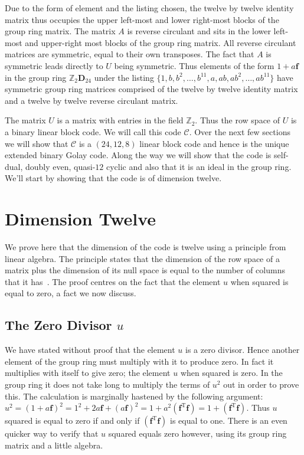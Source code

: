 Due to the form of element and the listing chosen, the twelve by twelve identity matrix thus occupies the upper left-most and lower right-most blocks of the group ring matrix.
The matrix $A$ is reverse circulant and sits in the lower left-most and upper-right most blocks of the group ring matrix.
All reverse circulant matrices are symmetric, equal to their own transposes.
The fact that $A$ is symmetric leads directly to $U$ being symmetric.
Thus elements of the form $1+a\mathbf{f}$ in the group ring $\mathbb{Z}_2 \mathbf{D}_{24}$ under the listing $\{1,b,b^2,\ldots,b^{11},a,ab,ab^2,\ldots,ab^{11}\}$ have symmetric group ring matrices comprised of the twelve by twelve identity matrix and a twelve by twelve reverse circulant matrix.

The matrix $U$ is a matrix with entries in the field $\mathbb{Z}_2$.
Thus the row space of $U$ is a binary linear block code.
We will call this code $\mathcal{C}$.
Over the next few sections we will show that $\mathcal{C}$ is a $(24,12,8)$ linear block code and hence is the unique extended binary Golay code.
Along the way we will show that the code is self-dual, doubly even, quasi-$12$ cyclic and also that it is an ideal in the group ring.
We'll start by showing that the code is of dimension twelve.

\section{Dimension Twelve}
We prove here that the dimension of the code is twelve using a principle from linear algebra.
The principle states that the dimension of the row space of a matrix plus the dimension of its null space is equal to the number of columns that it has~\cite[p.~245]{mac99}.
The proof centres on the fact that the element $u$ when squared is equal to zero, a fact we now discuss.

\subsection{The Zero Divisor $u$}
\label{sect:golayzdu}
We have stated without proof that the element $u$ is a zero divisor.
Hence another element of the group ring must multiply with it to produce zero.
In fact it multiplies with itself to give zero; the element $u$ when squared is zero.
In the group ring it does not take long to multiply the terms of $u^2$ out in order to prove this.
The calculation is marginally hastened by the following argument: $u^2 = (1+a\mathbf{f})^2 = 1^2 + 2a\mathbf{f} + (a\mathbf{f})^2 = 1 + a^2(\mathbf{f}^{\textrm{T}}\mathbf{f}) = 1 + (\mathbf{f}^{\textrm{T}} \mathbf{f})$.
Thus $u$ squared is equal to zero if and only if $(\mathbf{f}^{\textrm{T}} \mathbf{f})$ is equal to one.
There is an even quicker way to verify that $u$ squared equals zero however, using its group ring matrix and a little algebra.

